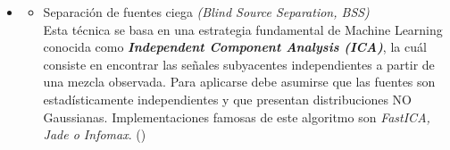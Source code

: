 \documentclass[12pt, a4paper]{article}
\begin{document}
\begin{itemize}
    \item []
    \begin{itemize}
        \item Separación de fuentes ciega \textit{(Blind Source Separation, BSS)}
        \\ \noindent Esta técnica se basa en una estrategia fundamental de Machine Learning conocida como \textbf{\textit{Independent Component Analysis (ICA)}}, la cuál consiste en encontrar las señales subyacentes independientes a partir de una mezcla observada. Para aplicarse debe asumirse que las fuentes son estadísticamente independientes y que presentan distribuciones NO Gaussianas. Implementaciones famosas de este algoritmo son \textit{FastICA, Jade o Infomax}. (\textbf{\textit{\cite{shi_blind_2011}}})
    \end{itemize}
\end{itemize}
\end{document}

